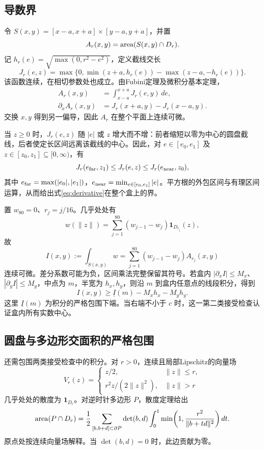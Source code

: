 \documentclass[11pt]{article}
\begin{document}
\subsection{导数界}
令 $S(x,y)=[x-a,x+a]\times[y-a,y+a]$，并置
\[
A_r(x,y)=\operatorname{area}(S(x,y)\cap D_r).
\]
记 $h_r(e)=\sqrt{\max(0,r^2-e^2)}$，定义截线交长
\begin{equation}\label{eq:chord}
J_r(e,z)=\max\{0,\min(z+a,h_r(e))-\max(z-a,-h_r(e))\}.
\end{equation}
该函数连续，在相切参数处也成立。由Fubini定理及微积分基本定理，
\begin{equation}\label{eq:derivative}
\begin{split}
A_r(x,y)&=\int_{x-a}^{x+a}J_r(e,y)\,de,\\
\partial_x A_r(x,y)&=J_r(x+a,y)-J_r(x-a,y).
\end{split}
\end{equation}
交换 $x,y$ 得到另一偏导，因此 $A_r$ 在整个平面上连续可微。

当 $z\ge0$ 时，$J_r(e,z)$ 随 $|e|$ 或 $z$ 增大而不增：前者缩短以零为中心的圆盘截线，后者使定长区间远离该截线的中心。因此，对 $e\in[e_0,e_1]$ 及 $z\in[z_0,z_1]\subseteq[0,\infty)$，有
\[
J_r(e_{\rm far},z_1)\le J_r(e,z)\le J_r(e_{\rm near},z_0),
\]
其中 $e_{\rm far}=\max(|e_0|,|e_1|)$，$e_{\rm near}=\min_{e\in[e_0,e_1]}|e|$。平方根的外包区间与有理区间运算，从而给出式\eqref{eq:derivative}在整个盒上的界。

置 $w_{80}=0$、$r_j=j/16$。几乎处处有
\[
w(\|z\|)=\sum_{j=1}^{80}(w_{j-1}-w_j)\mathbf1_{D_{r_j}}(z),
\]
故
\begin{equation}\label{eq:integral}
I(x,y):=\int_{S(x,y)}w
=\sum_{j=1}^{80}(w_{j-1}-w_j)A_{r_j}(x,y)
\end{equation}
连续可微。差分系数可能为负，区间乘法完整保留其符号。若盒内 $|\partial_x I|\le M_x$、$|\partial_y I|\le M_y$，中点为 $m$，半宽为 $h_x,h_y$，则沿 $m$ 到盒内任意点的线段积分，得到
\begin{equation}\label{eq:gradient}
I(x,y)\ge\underline I(m)-M_xh_x-M_yh_y.
\end{equation}
这里 $\underline I(m)$ 为积分的严格包围下端。当右端不小于 $c$ 时，这一第二类接受检查认证盒内所有实数中心。

\subsection{圆盘与多边形交面积的严格包围}
还需包围两类接受检查中的积分。对 $r>0$，连续且局部Lipschitz的向量场
\[
V_r(z)=\begin{cases}z/2,&\|z\|\le r,\\
r^2z/(2\|z\|^2),&\|z\|>r
\end{cases}
\]
几乎处处的散度为 $\mathbf1_{D_r}$。对逆时针多边形 $P$，散度定理给出
\begin{equation}\label{eq:green}
\operatorname{area}(P\cap D_r)=\frac12\sum_{[b,b+d]\subset\partial P}
\det(b,d)\int_0^1\min\!\left(1,\frac{r^2}{\|b+td\|^2}\right)dt.
\end{equation}
原点处按连续向量场解释。当 $\det(b,d)=0$ 时，此边贡献为零。
\end{document}
